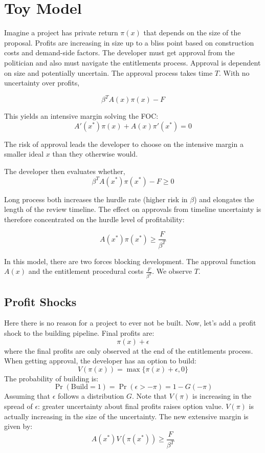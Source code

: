 \documentclass[12pt]{article}
\theoremstyle{definition}
\begin{document}
\section{Toy Model}
Imagine a project has private return $\pi(x)$ that depends on the size of the proposal. Profits are increasing in size up to a bliss point based on construction costs and demand-side factors. The developer must get approval from the politician and also must navigate the entitlements process. Approval is dependent on size and potentially uncertain. The approval process takes time $T$. With no uncertainty over profits,

$$\beta^TA(x)\pi(x)-F$$

This yields an intensive margin solving the FOC:
$$A'(x^*)\pi(x) + A(x)\pi'(x^*)=0$$

The risk of approval leads the developer to choose on the intensive margin a smaller ideal $x$ than they otherwise would. 

The developer then evaluates whether,
$$\beta^TA(x^*)\pi(x^*)-F\geq 0$$

Long process both increases the hurdle rate (higher risk in $\beta$) and elongates the length of the review timeline. The effect on approvals from timeline uncertainty is therefore concentrated on the hurdle level of profitability:

$$A(x^*)\pi(x^*)\geq \frac{F}{\beta^T}$$

In this model, there are two forces blocking development. The approval function $A(x)$ and the entitlement procedural costs $\frac{F}{\beta^T}$. We observe $T$.

\subsection{Profit Shocks}
Here there is no reason for a project to ever not be built. Now, let's add a profit shock to the building pipeline. Final profits are:
$$\pi(x) + \epsilon$$
where the final profits are only observed at the end of the entitlements process. When getting approval, the developer has an option to build:
$$V(\pi(x)) = \max\{\pi(x) + \epsilon, 0\}$$
The probability of building is:
$$\Pr(\text{Build} = 1) = \Pr(\epsilon>-\pi) = 1 - G(-\pi)$$
Assuming that $\epsilon$ follows a distribution $G$. Note that $V(\pi)$ is increasing in the spread of $\epsilon$: greater uncertainty about final profits raises option value. $V(\pi)$ is actually increasing in the size of the uncertainty. The new extensive margin is given by:
$$A(x^*)V(\pi(x^*))\geq \frac{F}{\beta^T}$$
\end{document}
